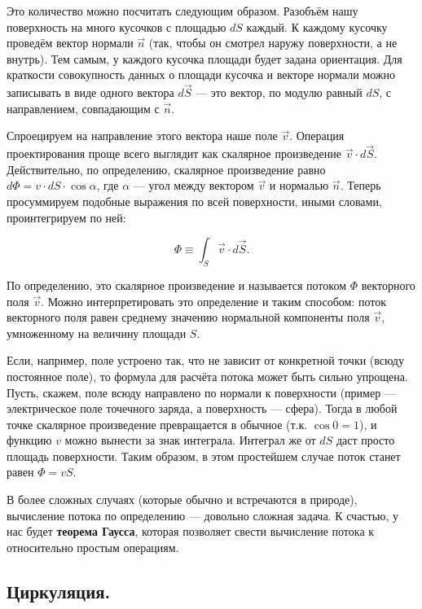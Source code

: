 \documentclass[12pt,a4paper]{article}
\numberwithin{equation}{section}
\numberwithin{equation}{section}
\begin{document}
Это количество можно посчитать следующим образом. Разобъём нашу
поверхность на много кусочков с площадью $dS$ каждый. К каждому
кусочку проведём вектор нормали $\vec{n}$ (так, чтобы он смотрел
наружу поверхности, а не внутрь). Тем самым, у каждого кусочка площади
будет задана ориентация. Для краткости совокупность данных о площади
кусочка и векторе нормали можно записывать в виде одного вектора
$d\vec{S}$ --- это вектор, по модулю равный $dS$, с направлением,
совпадающим с $\vec{n}$.

Спроецируем на направление этого вектора наше поле $\vec{v}$. Операция
проектирования проще всего выглядит как скалярное произведение
$\vec{v} \cdot d \vec{S}$. Действительно, по определению, скалярное
произведение равно $d\Phi = v \cdot dS \cdot \cos \alpha$, где $\alpha$ ---
угол между вектором $\vec{v}$ и нормалью $\vec{n}$. Теперь
просуммируем подобные выражения по всей поверхности, иными словами,
проинтегрируем по ней:

\begin{equation}
  \label{eq:def_flux}
  \Phi \equiv \int_S \vec{v} \cdot d \vec{S}.
\end{equation}

По определению, это скалярное произведение и называется потоком $\Phi$ 
векторного поля $\vec{v}$. Можно интерпретировать это определение и
таким способом: поток векторного поля равен среднему значению
нормальной компоненты поля $\vec{v}$, умноженному на величину площади
$S$. 

Если, например, поле устроено так, что не зависит от конкретной точки
(всюду постоянное поле), то формула для расчёта потока может быть
сильно упрощена. Пусть, скажем, поле всюду направлено по нормали к
поверхности (пример --- электрическое поле точечного заряда, а
поверхность --- сфера). Тогда в любой точке скалярное произведение
превращается в обычное (т.к. $\cos 0 = 1$), и функцию $v$ можно
вынести за знак интеграла. Интеграл же от $dS$ даст просто площадь
поверхности. Таким образом, в этом простейшем случае поток станет
равен $\Phi = vS$. 

В более сложных случаях (которые обычно и встречаются в природе),
вычисление потока по определению --- довольно сложная задача. К
счастью, у нас будет \textbf{теорема Гаусса}, которая позволяет свести
вычисление потока к относительно простым операциям. 

\subsection{Циркуляция.}
\label{sec:curl}
\end{document}
